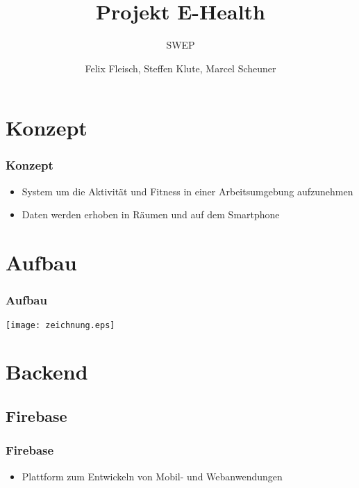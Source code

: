 \documentclass[11pt]{beamer}
\begin{document}
	\author{Felix Fleisch, Steffen Klute, Marcel Scheuner}
	\title{Projekt E-Health}
	\subtitle{SWEP}
	\begin{frame}[plain]
	\maketitle
\end{frame}


\section{Konzept}



\begin{frame}
\frametitle{Konzept}

\begin{itemize}
	\item System um die Aktivität und Fitness in einer Arbeitsumgebung aufzunehmen
	\item Daten werden erhoben in Räumen und auf dem Smartphone
\end{itemize}

\end{frame}



\section{Aufbau}
\begin{frame}
\frametitle{Aufbau}
\begin{centering}
	\hspace*{1.5 cm}\texttt{[image: zeichnung.eps]}
\end{centering}

\end{frame}


\section{Backend}

\subsection{Firebase}
\begin{frame}
\frametitle{Firebase}
\begin{itemize}
\item Plattform zum Entwickeln von Mobil- und Webanwendungen
\end{itemize}

\end{frame}
\end{document}
